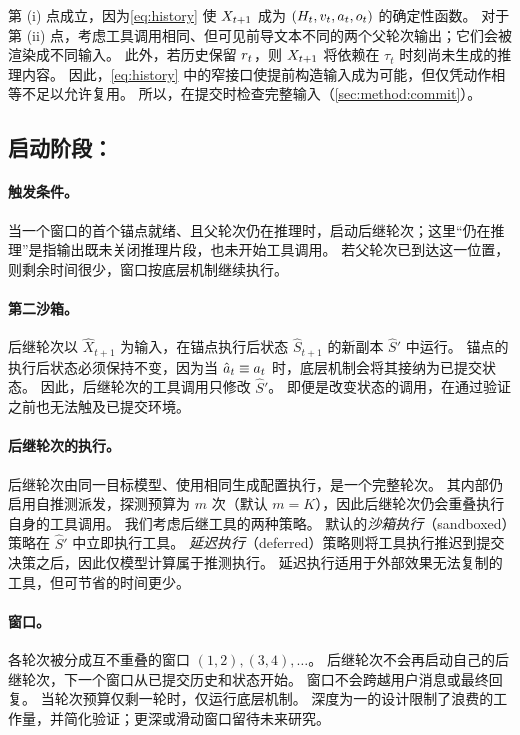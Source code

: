 第 (i) 点成立，因为\cref{eq:history} 使 $X_{t+1}$ 成为 $(H_t,v_{t},a_{t},o_{t})$ 的确定性函数。
对于第 (ii) 点，考虑工具调用相同、但可见前导文本不同的两个父轮次输出；它们会被渲染成不同输入。
此外，若历史保留 $r_{t}$，则 $X_{t+1}$ 将依赖在 $\tau_t$ 时刻尚未生成的推理内容。
因此，\cref{eq:history} 中的窄接口使提前构造输入成为可能，但仅凭动作相等不足以允许复用。
所以，\method 在提交时检查完整输入（\cref{sec:method:commit}）。

\subsection{启动阶段：\stratLaunch}
\label{sec:method:launch}

\paragraph{触发条件。}
当一个窗口的首个锚点就绪、且父轮次仍在推理时，\method 启动后继轮次；这里“仍在推理”是指输出既未关闭推理片段，也未开始工具调用。
若父轮次已到达这一位置，则剩余时间很少，窗口按底层机制继续执行。

\paragraph{第二沙箱。}
后继轮次以 $\hat X_{t+1}$ 为输入，在锚点执行后状态 $\hat S_{t+1}$ 的新副本 $\hat S'$ 中运行。
锚点的执行后状态必须保持不变，因为当 $\hat a_t\equiv a_{t}$ 时，底层机制会将其接纳为已提交状态。
因此，后继轮次的工具调用只修改 $\hat S'$。
即便是改变状态的调用，在通过验证之前也无法触及已提交环境。

\paragraph{后继轮次的执行。}
后继轮次由同一目标模型、使用相同生成配置执行，是一个完整轮次。
其内部仍启用自推测派发，探测预算为 $m$ 次（默认 $m=K$），因此后继轮次仍会重叠执行自身的工具调用。
我们考虑后继工具的两种策略。
默认的\emph{沙箱执行}（sandboxed）策略在 $\hat S'$ 中立即执行工具。
\emph{延迟执行}（deferred）策略则将工具执行推迟到提交决策之后，因此仅模型计算属于推测执行。
延迟执行适用于外部效果无法复制的工具，但可节省的时间更少。

\paragraph{窗口。}
各轮次被分成互不重叠的窗口 $(1,2),(3,4),\dots$。
后继轮次不会再启动自己的后继轮次，下一个窗口从已提交历史和状态开始。
窗口不会跨越用户消息或最终回复。
当轮次预算仅剩一轮时，仅运行底层机制。
深度为一的设计限制了浪费的工作量，并简化验证；更深或滑动窗口留待未来研究。

